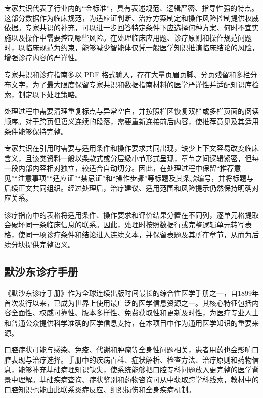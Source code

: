 专家共识代表了行业内的“金标准”，具有表述规范、逻辑严密、指导性强的特点。这部分数据作为临床规范，为适应证判断、治疗方案制定和操作风险控制提供权威依据。专家共识的补充，可以进一步回答特定条件下应选择何种方案、何时不宜实施以及操作中需要控制哪些风险。在处理临床应用题、诊疗原则和操作规范问题时，以临床规范为约束，能够减少智能体仅凭一般医学知识推演临床结论的风险，增强诊疗内容的严谨性。

专家共识和诊疗指南多以 PDF 格式输入，存在大量页眉页脚、分页残留和多栏分布文字，为了最大限度保留专家共识和数据指南材料的医学严谨性并适配知识库检索，制定以下处理策略。


处理过程中需要清理重复标点与异常空白，并按照栏区恢复双栏或多栏页面的阅读顺序。对于跨页但语义连续的段落，需要重新连接前后内容，使推荐意见及其适用条件能够保持完整。


专家共识在引用时需要与适用条件和操作要求共同出现，缺少上下文容易改变临床含义，且该类资料一般以条款式或分层级小节形式呈现，章节之间逻辑紧密，但每一段内部内容相对独立，较适合自动切分。因此，在处理过程中保留“推荐意见”“注意事项”“适应证”“禁忌证”和“操作步骤”等标题及其条款编号，并将标题与后续正文共同组织。经过处理后，治疗建议、适用范围和风险提示仍然保持明确对应关系。


诊疗指南中的表格将适用条件、操作要求和评价结果分置在不同列，逐单元格提取会破坏同一条临床信息的联系。因此，处理时按照数据行或完整逻辑单元转写表格，使同一项诊疗条件和结论进入连续文本，并保留表题及其所在章节，从而为后续分块提供完整语义。

\subsection{默沙东诊疗手册}

《默沙东诊疗手册》作为全球连续出版时间最长的综合性医学手册之一，自1899年首次发行以来，已成为世界上使用最广泛的医学信息资源之一。其核心特征包括内容全面性、权威可靠性、版本多样性、免费获取性和更新及时性，为医疗专业人士和普通公众提供科学准确的医学信息支持，在本项目中作为通用医学知识的重要来源。

口腔症状可能与感染、免疫、代谢和肿瘤等全身性问题相关，患者用药也会影响口腔表现与治疗选择。手册中的疾病百科、症状解析、检查方法、治疗原则和药物信息，能够补充基础病理知识缺失，使系统能够把口腔专科问题放入更完整的医学背景中理解。基础疾病查询、症状鉴别和药物咨询可从中获取跨学科线索，教材中的口腔知识也能由此联系炎症反应、组织损伤和全身疾病机制。

